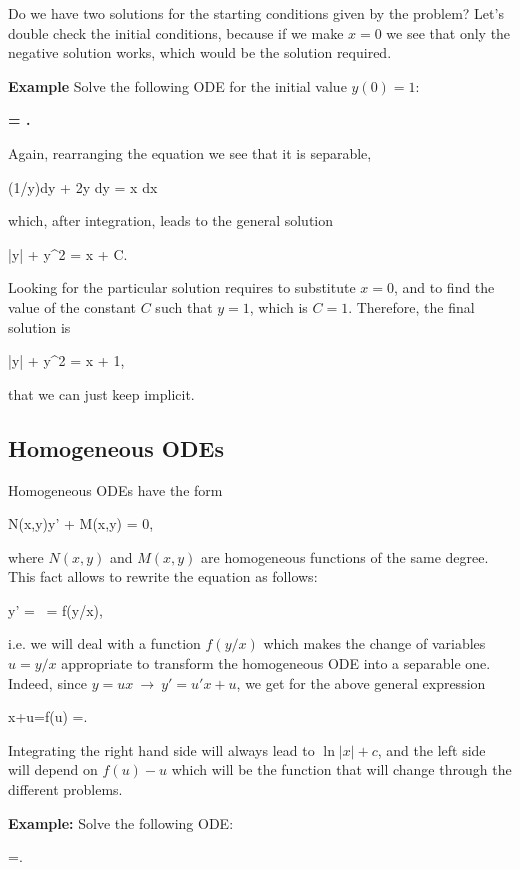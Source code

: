 Do we have two solutions for the starting conditions given by the problem? Let's double check the initial conditions, because if we make $x=0$ we see that only the negative solution works, which would be the solution required.

{\bf Example} Solve the following ODE for the initial value $y(0)=1$:

{\bf \bnn {} = . \enn }

Again, rearranging the equation we see that it is separable,

\bnn (1/y)dy + 2y dy = \cos x dx \enn

which, after integration, leads to the general solution

\bnn \ln |y| + y^2 = \sin x + C. \enn

Looking for the particular solution requires to substitute $x=0$, and to find the value of the constant $C$ such that $y=1$, which is $C=1$. Therefore, the final solution is

\bnn \ln |y| + y^2 = \sin x + 1, \enn

that we can just keep implicit.

\subsection{Homogeneous ODEs}


Homogeneous ODEs have the form 

\bnn N(x,y)y' + M(x,y) = 0, \enn

where $N(x,y)$ and $M(x,y)$ are homogeneous functions of the same degree. This fact allows to rewrite the equation as follows:

 \bnn y' =\  = f(y/x), \enn

i.e. we will deal with a function $f(y/x)$ which makes the change of variables $u = y/x$ appropriate to transform the homogeneous ODE into a separable one. Indeed, since $y=ux \ \rightarrow \ y'=u'x+u$, we get for the above general expression

\bnn x+u=f(u) \quad \rightarrow {}=. \enn

Integrating the right hand side will always lead to $\ln |x|+c$, and the left side
will depend on $f(u)-u$ which will be the function that will change through the different problems.

{\bf Example: } Solve the following ODE:

\bnn
 	=.
\enn

